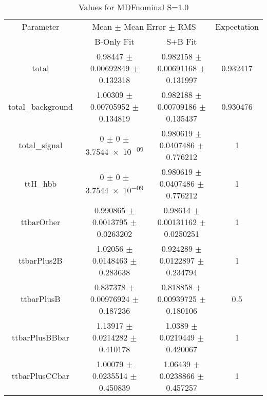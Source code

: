 \begin{table}
\centering
\caption{Values for MDFnominal S=1.0}
\begin{tabular}{cccc}
\toprule
Parameter & \multicolumn{2}{c}{Mean $\pm$ Mean Error $\pm$ RMS} & Expectation\\
 & B-Only Fit & S+B Fit & \\
\midrule
total & \num{0.98447} $\pm$ \num{0.00692849} $\pm$ \num{0.132318} & \num{0.982158} $\pm$ \num{0.00691168} $\pm$ \num{0.131997} & \num{0.932417}\\
total\_background & \num{1.00309} $\pm$ \num{0.00705952} $\pm$ \num{0.134819} & \num{0.982188} $\pm$ \num{0.00709186} $\pm$ \num{0.135437} & \num{0.930476}\\
total\_signal & \num{0} $\pm$ \num{0} $\pm$ \num{3.7544e-09} & \num{0.980619} $\pm$ \num{0.0407486} $\pm$ \num{0.776212} & \num{1}\\
ttH\_hbb & \num{0} $\pm$ \num{0} $\pm$ \num{3.7544e-09} & \num{0.980619} $\pm$ \num{0.0407486} $\pm$ \num{0.776212} & \num{1}\\
ttbarOther & \num{0.990865} $\pm$ \num{0.0013795} $\pm$ \num{0.0263202} & \num{0.98614} $\pm$ \num{0.00131162} $\pm$ \num{0.0250251} & \num{1}\\
ttbarPlus2B & \num{1.02056} $\pm$ \num{0.0148463} $\pm$ \num{0.283638} & \num{0.924289} $\pm$ \num{0.0122897} $\pm$ \num{0.234794} & \num{1}\\
ttbarPlusB & \num{0.837378} $\pm$ \num{0.00976924} $\pm$ \num{0.187236} & \num{0.818858} $\pm$ \num{0.00939725} $\pm$ \num{0.180106} & \num{0.5}\\
ttbarPlusBBbar & \num{1.13917} $\pm$ \num{0.0214282} $\pm$ \num{0.410178} & \num{1.0389} $\pm$ \num{0.0219449} $\pm$ \num{0.420067} & \num{1}\\
ttbarPlusCCbar & \num{1.00079} $\pm$ \num{0.0235514} $\pm$ \num{0.450839} & \num{1.06439} $\pm$ \num{0.0238866} $\pm$ \num{0.457257} & \num{1}\\
\bottomrule
\end{tabular}
\end{table}